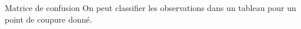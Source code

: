 \documentclass[
  ignorenonframetext,
]{beamer}
\begin{document}
\begin{frame}{Matrice de confusion}
\label{matrice-de-confusion}
On peut classifier les observations dans un tableau pour un point de
coupure donné.

\begin{table}

\caption{\label{tbl-confumat}Matrice de confusion avec point de coupure
optimal. Les entrées donnent le décompte du nombre d'observation par
combinaison \((Y, \widehat{Y})\)}


\end{table}%
\end{frame}
\end{document}
